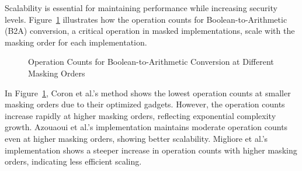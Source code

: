 Scalability is essential for maintaining performance while increasing security levels. Figure~\ref{fig:b2a_comparison} illustrates how the operation counts for Boolean-to-Arithmetic (B2A) conversion, a critical operation in masked implementations, scale with the masking order for each implementation.

\begin{figure}[h]
    \centering
    \caption{Operation Counts for Boolean-to-Arithmetic Conversion at Different Masking Orders}
    \label{fig:b2a_comparison}
\end{figure}

In Figure~\ref{fig:b2a_comparison}, Coron et al.'s method shows the lowest operation counts at smaller masking orders due to their optimized gadgets. However, the operation counts increase rapidly at higher masking orders, reflecting exponential complexity growth. Azouaoui et al.'s implementation maintains moderate operation counts even at higher masking orders, showing better scalability. Migliore et al.'s implementation shows a steeper increase in operation counts with higher masking orders, indicating less efficient scaling.


